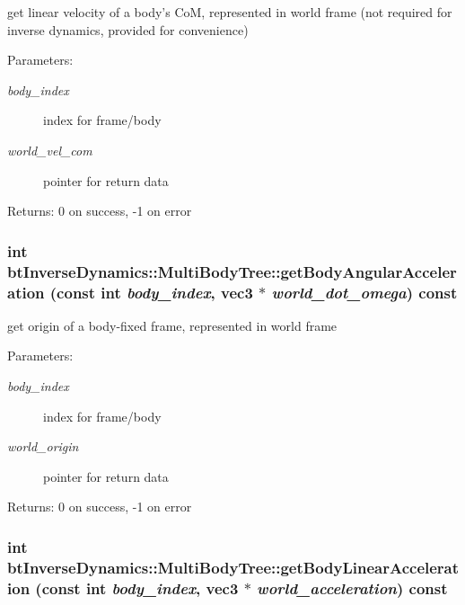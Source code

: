 get linear velocity of a body's CoM, represented in world frame (not required for inverse dynamics, provided for convenience) \begin{Desc}
\item[Parameters:]
\begin{description}
\item[{\em body\_\-index}]index for frame/body \item[{\em world\_\-vel\_\-com}]pointer for return data \end{description}
\end{Desc}
\begin{Desc}
\item[Returns:]0 on success, -1 on error \end{Desc}
\hypertarget{classbt_inverse_dynamics_1_1_multi_body_tree_1f216eaec9b229133a1a59ac0b415d13}{
\subsubsection[getBodyAngularAcceleration]{\setlength{\rightskip}{0pt plus 5cm}int btInverseDynamics::MultiBodyTree::getBodyAngularAcceleration (const int {\em body\_\-index}, \/  {\bf vec3} $\ast$ {\em world\_\-dot\_\-omega}) const}}
\label{classbt_inverse_dynamics_1_1_multi_body_tree_1f216eaec9b229133a1a59ac0b415d13}


get origin of a body-fixed frame, represented in world frame \begin{Desc}
\item[Parameters:]
\begin{description}
\item[{\em body\_\-index}]index for frame/body \item[{\em world\_\-origin}]pointer for return data \end{description}
\end{Desc}
\begin{Desc}
\item[Returns:]0 on success, -1 on error \end{Desc}
\hypertarget{classbt_inverse_dynamics_1_1_multi_body_tree_07aeba9ee7505e1c2a4c8a5f317bcf22}{
\subsubsection[getBodyLinearAcceleration]{\setlength{\rightskip}{0pt plus 5cm}int btInverseDynamics::MultiBodyTree::getBodyLinearAcceleration (const int {\em body\_\-index}, \/  {\bf vec3} $\ast$ {\em world\_\-acceleration}) const}}
\label{classbt_inverse_dynamics_1_1_multi_body_tree_07aeba9ee7505e1c2a4c8a5f317bcf22}


